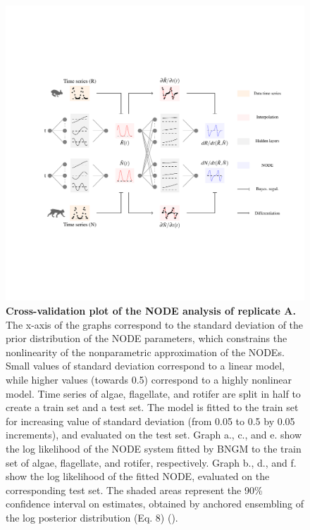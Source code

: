 \documentclass[11pt, oneside]{article}
\begin{document}
\newpage
\begin{figure}[H]
\includegraphics[width=1\linewidth,page=15]{figures/main.pdf}
\caption{
    \textbf{Cross-validation plot of the NODE analysis of replicate A.}
    The x-axis of the graphs correspond to the standard deviation of the prior distribution of the NODE parameters, which constrains the nonlinearity of the nonparametric approximation of the NODEs.
    Small values of standard deviation correspond to a linear model, while higher values (towards 0.5) correspond to a highly nonlinear model.
    Time series of algae, flagellate, and rotifer are split in half to create a train set and a test set. 
    The model is fitted to the train set for increasing value of standard deviation (from 0.05 to 0.5 by 0.05 increments), and evaluated on the test set.
    Graph a., c., and e. show the log likelihood of the NODE system fitted by BNGM to the train set of algae, flagellate, and rotifer, respectively.
    Graph b., d., and f. show the log likelihood of the fitted NODE, evaluated on the corresponding test set.
    The shaded areas represent the 90\% confidence interval on estimates, obtained by anchored ensembling of the log posterior distribution (Eq. 8) (\cite{Pearce2018}).
}
\end{figure}
\newpage
\end{document}
